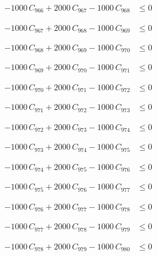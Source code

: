 \documentclass[a4paper,11pt]{article}
\begin{document}
\begin{align}
-1000\,C_{966} + 2000\,C_{967} - 1000\,C_{968} &\leq 0 \nonumber
\end{align}

\begin{align}
-1000\,C_{967} + 2000\,C_{968} - 1000\,C_{969} &\leq 0 \nonumber
\end{align}

\begin{align}
-1000\,C_{968} + 2000\,C_{969} - 1000\,C_{970} &\leq 0 \nonumber
\end{align}

\begin{align}
-1000\,C_{969} + 2000\,C_{970} - 1000\,C_{971} &\leq 0 \nonumber
\end{align}

\begin{align}
-1000\,C_{970} + 2000\,C_{971} - 1000\,C_{972} &\leq 0 \nonumber
\end{align}

\begin{align}
-1000\,C_{971} + 2000\,C_{972} - 1000\,C_{973} &\leq 0 \nonumber
\end{align}

\begin{align}
-1000\,C_{972} + 2000\,C_{973} - 1000\,C_{974} &\leq 0 \nonumber
\end{align}

\begin{align}
-1000\,C_{973} + 2000\,C_{974} - 1000\,C_{975} &\leq 0 \nonumber
\end{align}

\begin{align}
-1000\,C_{974} + 2000\,C_{975} - 1000\,C_{976} &\leq 0 \nonumber
\end{align}

\begin{align}
-1000\,C_{975} + 2000\,C_{976} - 1000\,C_{977} &\leq 0 \nonumber
\end{align}

\begin{align}
-1000\,C_{976} + 2000\,C_{977} - 1000\,C_{978} &\leq 0 \nonumber
\end{align}

\begin{align}
-1000\,C_{977} + 2000\,C_{978} - 1000\,C_{979} &\leq 0 \nonumber
\end{align}

\begin{align}
-1000\,C_{978} + 2000\,C_{979} - 1000\,C_{980} &\leq 0 \nonumber
\end{align}
\end{document}
